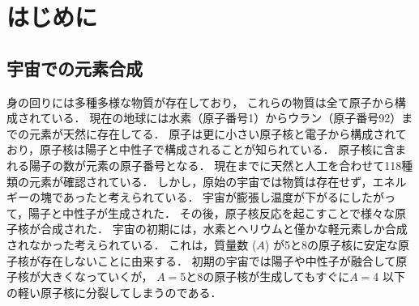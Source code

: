 \documentclass[../master]{subfiles}
\begin{document}
\chapter{はじめに}
\section{宇宙での元素合成}
\label{seq::nucleaosynthesis}
身の回りには多種多様な物質が存在しており，
これらの物質は全て原子から構成されている．
現在の地球には水素（原子番号1）からウラン（原子番号92）までの元素が天然に存在してる．
原子は更に小さい原子核と電子から構成されており，原子核は陽子と中性子で構成されることが知られている．
原子核に含まれる陽子の数が元素の原子番号となる．
現在までに天然と人工を合わせて118種類の元素が確認されている．
しかし，原始の宇宙では物質は存在せず，エネルギーの塊であったと考えられている．
宇宙が膨張し温度が下がるにしたがって，陽子と中性子が生成された．
その後，原子核反応を起こすことで様々な原子核が合成された．
宇宙の初期には，水素とヘリウムと僅かな軽元素しか合成されなかった考えられている．
これは，質量数 ($A$) が5と8の原子核に安定な原子核が存在しないことに由来する．
初期の宇宙では陽子や中性子が融合して原子核が大きくなっていくが，
$A = $5と8の原子核が生成してもすぐに$A = $4 以下の軽い原子核に分裂してしまうのである．
\end{document}
